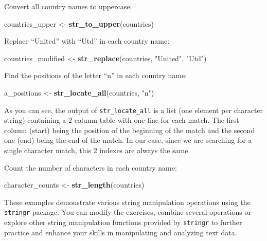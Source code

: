 \documentclass[
]{book}
\newenvironment{Shaded}{\begin{snugshade}}{\end{snugshade}}
\newcommand{\FunctionTok}[1]{\textcolor[rgb]{0.13,0.29,0.53}{\textbf{#1}}}
\newcommand{\NormalTok}[1]{#1}
\newcommand{\OtherTok}[1]{\textcolor[rgb]{0.56,0.35,0.01}{#1}}
\newcommand{\StringTok}[1]{\textcolor[rgb]{0.31,0.60,0.02}{#1}}
\begin{document}
Convert all country names to uppercase:

\begin{Shaded}
\begin{Highlighting}[]
\NormalTok{countries\_upper }\OtherTok{\textless{}{-}} \FunctionTok{str\_to\_upper}\NormalTok{(countries)}
\end{Highlighting}
\end{Shaded}

Replace ``United'' with ``Utd'' in each country name:

\begin{Shaded}
\begin{Highlighting}[]
\NormalTok{countries\_modified }\OtherTok{\textless{}{-}} \FunctionTok{str\_replace}\NormalTok{(countries, }\StringTok{"United"}\NormalTok{, }\StringTok{"Utd"}\NormalTok{)}
\end{Highlighting}
\end{Shaded}

Find the positions of the letter ``n'' in each country name:

\begin{Shaded}
\begin{Highlighting}[]
\NormalTok{a\_positions }\OtherTok{\textless{}{-}} \FunctionTok{str\_locate\_all}\NormalTok{(countries, }\StringTok{"n"}\NormalTok{)}
\end{Highlighting}
\end{Shaded}

As you can see, the output of \texttt{str\_locate\_all} is a list (one element per character string) containing a 2 column table with one line for each match. The first column (start) being the position of the beginning of the match and the second one (end) being the end of the match. In our case, since we are searching for a single character match, this 2 indexes are always the same.

Count the number of characters in each country name:

\begin{Shaded}
\begin{Highlighting}[]
\NormalTok{character\_counts }\OtherTok{\textless{}{-}} \FunctionTok{str\_length}\NormalTok{(countries)}
\end{Highlighting}
\end{Shaded}

These examples demonstrate various string manipulation operations using the \texttt{stringr} package. You can modify the exercises, combine several operations or explore other string manipulation functions provided by \texttt{stringr} to further practice and enhance your skills in manipulating and analyzing text data.
\end{document}
